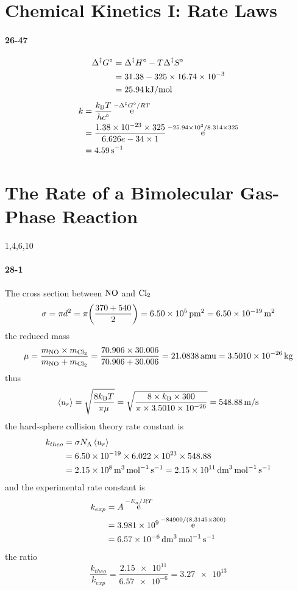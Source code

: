 \documentclass[a4paper]{article}
\DeclareMathOperator{\e}{\mathrm{e}}
\newcommand{\NA}{N_\mathrm{A}}
\newcommand{\kB}{k_\mathrm{B}}
\newcommand{\ex}[1]{\paragraph{#1}}
\numberwithin{equation}{section}
\begin{document}
\section{Chemical Kinetics I: Rate Laws}
\ex{26-47}
\begin{align}
\Delta^\ddagger G^\circ &= \Delta^\ddagger H^\circ - T\Delta^\ddagger S^\circ \notag\\
&= 31.38 - 325\times \num{16.74e-3} \notag\\
&= \SI{25.94}{kJ/mol}
\end{align}
\begin{align}
k &= \dfrac{\kB T}{h c^\circ}\e^{-\Delta^\ddagger G^\circ/RT} \notag\\
&= \dfrac{\num{1.38e-23}\times 325}{6.626e-34\times 1} \e^{\num{-25.94e3}/8.314\times 325} \notag\\
&= \SI{4.59}{s^{-1}}
\end{align}


\setcounter{section}{27}
\section{The Rate of a Bimolecular Gas-Phase Reaction}
1,4,6,10\\
\ex{28-1}
The cross section between $ \ce{NO} $ and $ \ce{Cl_2} $
\begin{equation}\label{key}
\sigma = \pi d^2 = \pi \qty(\dfrac{370 + 540}{2}) = \SI{6.50e5}{pm^2} = \SI{6.50e-19}{m^2}
\end{equation}
the reduced mass
\begin{equation}\label{key}
\mu = \dfrac{m_{\ce{NO}}\times m_{\ce{Cl_2}}}{m_{\ce{NO}} + m_{\ce{Cl_2}}} = \dfrac{70.906\times 30.006}{70.906 + 30.006} = \SI{21.0838}{amu} = \SI{3.5010e-26}{kg}
\end{equation}
thus 
\begin{equation}\label{key}
\ev{u_r} = \sqrt{\dfrac{8\kB T}{\pi \mu}} = \sqrt{\dfrac{8\times \kB\times 300}{\pi\times \num{3.5010e-26}}} = \SI{548.88}{m/s}
\end{equation}
the hard-sphere collision theory rate constant is
\begin{align}\label{key}
k_{theo} &= \sigma \NA \ev{u_r} \notag\\
&= \num{6.50e-19}\times \num{6.022e23}\times 548.88 \notag\\
&= \SI{2.15e8}{m^3.mol^{-1}.s^{-1}} = \SI{2.15e11}{dm^3.mol^{-1}.s^{-1}} 
\end{align}
and the experimental rate constant is
\begin{align}
k_{exp} &= A\e^{-E_a/RT} \notag\\
&= \num{3.981e9}\e^{-84900/(8.3145\times 300)} \notag\\
&= \SI{6.57e-6}{dm^3.mol^{-1}.s^{-1}}
\end{align}
the ratio
\begin{equation}\label{key}
\dfrac{k_{theo}}{k_{exp}} = \dfrac{\num{2.15e11}}{\num{6.57e-6}} = \num{3.27e13}
\end{equation}
\end{document}
